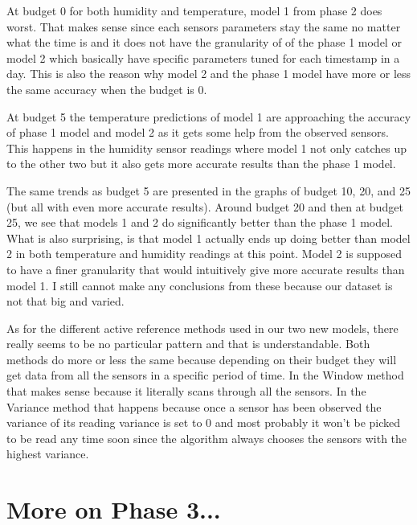 \documentclass{article}
\begin{document}
At budget 0 for both humidity and temperature,
model 1 from phase 2 does worst. That makes sense
since each sensors parameters stay the same no
matter what the time is and it does not have the
granularity of of the phase 1 model or model 2
which basically have specific parameters tuned
for each timestamp in a day. This is also the
reason why model 2 and the phase 1 model have
more or less the same accuracy when the budget
is 0.

At budget 5 the temperature predictions
of model 1 are approaching the accuracy of
phase 1 model and model 2 as it gets some
help from the observed sensors. This happens
in the humidity sensor readings where model 1
not only catches up to the other two but it also
gets more accurate results than the phase 1
model.

The same trends as budget 5 are presented in
the graphs of budget 10, 20, and 25 (but all with even
more accurate results). Around budget 20 and then
at budget 25, we see that models 1 and 2 do
significantly better than the phase 1 model.
What is also surprising, is that model 1 actually
ends up doing better than model 2 in both
temperature and humidity readings at this point.
Model 2 is supposed to have a finer granularity
that would intuitively give more accurate results
than model 1. I still cannot make any conclusions
from these because our dataset is not that big
and varied.

As for the different active reference methods
used in our two new models, there really seems
to be no particular pattern and that is
understandable. Both methods do more or less
the same because depending on their budget
they will get data from all the sensors in a
specific period of time. In the Window method
that makes sense because it literally scans
through all the sensors. In the Variance method
that happens because once a sensor has been
observed the variance of its reading variance
is set to 0 and most probably it won't be
picked to be read any time soon since the
algorithm always chooses the sensors with
the highest variance.

\newpage

\section{More on Phase 3...}
\end{document}
